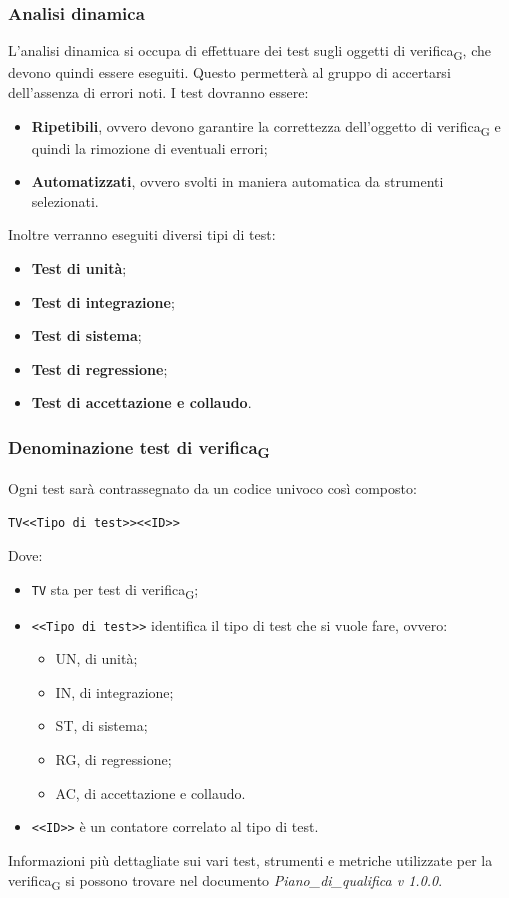 \subsubsection{Analisi dinamica}
L'analisi dinamica si occupa di effettuare dei test sugli oggetti di verifica\textsubscript{G}, che devono quindi essere eseguiti. Questo permetterà al gruppo di accertarsi dell'assenza di errori noti.
I test dovranno essere:
\begin{itemize}
	\item \textbf{Ripetibili}, ovvero devono garantire la correttezza dell'oggetto di verifica\textsubscript{G} e quindi la rimozione di eventuali errori;
	\item \textbf{Automatizzati}, ovvero svolti in maniera automatica da strumenti selezionati.
\end{itemize}
Inoltre verranno eseguiti diversi tipi di test:
\begin{itemize}
	\item \textbf{Test di unità};
	\item \textbf{Test di integrazione};
	\item \textbf{Test di sistema};
	\item \textbf{Test di regressione};
	\item \textbf{Test di accettazione e collaudo}.
\end{itemize}
\subsubsection{Denominazione test di verifica\textsubscript{G}}
Ogni test sarà contrassegnato da un codice univoco così composto:
\begin{center}
	\verb|TV<<Tipo di test>><<ID>>|
\end{center}
Dove:
\begin{itemize}
	\item \verb|TV| sta per test di verifica\textsubscript{G};
	\item \verb|<<Tipo di test>>| identifica il tipo di test che si vuole fare, ovvero:
	\begin{itemize}
		\item UN, di unità;
		\item IN, di integrazione;
		\item ST, di sistema;
		\item RG, di regressione;
		\item AC, di accettazione e collaudo.
	\end{itemize}
	\item \verb|<<ID>>| è un contatore correlato al tipo di test.
\end{itemize}
Informazioni più dettagliate sui vari test, strumenti e metriche utilizzate per la verifica\textsubscript{G} si possono trovare nel documento \textit{Piano\_di\_qualifica v 1.0.0}.

